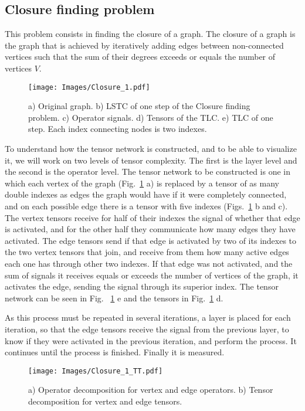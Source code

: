 \subsection{Closure finding problem}
This problem consists in finding the closure of a graph. The closure of a graph is the graph that is achieved by iteratively adding edges between non-connected vertices such that the sum of their degrees exceeds or equals the number of vertices $V$. 

\begin{figure}[h]
    \centering
    \texttt{[image: Images/Closure\_1.pdf]}
    \caption{a) Original graph. b) LSTC of one step of the Closure finding problem. c) Operator signals. d) Tensors of the TLC. e) TLC of one step. Each index connecting nodes is two indexes.}
    \label{fig: Closure 1}
\end{figure}

To understand how the tensor network is constructed, and to be able to visualize it, we will work on two levels of tensor complexity. The first is the layer level and the second is the operator level. The tensor network to be constructed is one in which each vertex of the graph (Fig.~\ref{fig: Closure 1} a) is replaced by a tensor of as many double indexes as edges the graph would have if it were completely connected, and on each possible edge there is a tensor with five indexes (Figs.~\ref{fig: Closure 1} b and c). The vertex tensors receive for half of their indexes the signal of whether that edge is activated, and for the other half they communicate how many edges they have activated. The edge tensors send if that edge is activated by two of its indexes to the two vertex tensors that join, and receive from them how many active edges each one has through other two indexes. If that edge was not activated, and the sum of signals it receives equals or exceeds the number of vertices of the graph, it activates the edge, sending the signal through its superior index. The tensor network can be seen in Fig. ~\ref{fig: Closure 1} e and the tensors in Fig.~\ref{fig: Closure 1} d.


As this process must be repeated in several iterations, a layer is placed for each iteration, so that the edge tensors receive the signal from the previous layer, to know if they were activated in the previous iteration, and perform the process. It continues until the process is finished. Finally it is measured.

\begin{figure}[h]
    \centering
    \texttt{[image: Images/Closure\_1\_TT.pdf]}
    \caption{a) Operator decomposition for vertex and edge operators. b) Tensor decomposition for vertex and edge tensors.}
    \label{fig: Closure 1 TT}
\end{figure}


